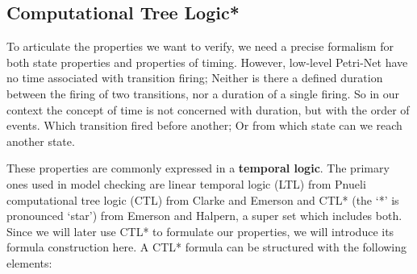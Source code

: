 \subsection{Computational Tree Logic*}
\label{rel_ctl}
To articulate the properties we want to verify, we need a precise formalism for both state properties and properties of timing.
However, low-level Petri-Net have no time associated with transition firing;
Neither is there a defined duration between the firing of two transitions, nor a duration of a single firing.
So in our context the concept of time is not concerned with duration, but with the order of events.
Which transition fired before another; Or from which state can we reach another state.

These properties are commonly expressed in a \textbf{temporal logic}.
The primary ones used in model checking are linear temporal logic (LTL) from Pnueli\cite{pnueli1977temporal} computational tree logic (CTL) from Clarke and Emerson\cite{clarke1981design} and CTL* (the `*' is pronounced `star') from Emerson and Halpern\cite{emerson1985decision}, a super set which includes both.
Since we will later use CTL* to formulate our properties, we will introduce its formula construction here.
A CTL* formula can be structured with the following elements:
